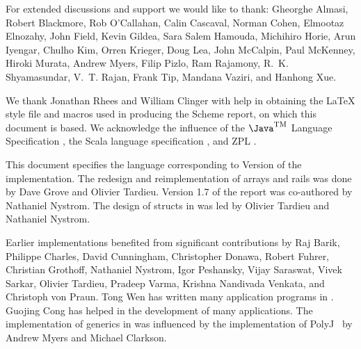 For extended discussions and support we would like to thank: 
Gheorghe Almasi,
Robert Blackmore,
Rob O'Callahan, 
Calin Cascaval, 
Norman Cohen, 
Elmootaz Elnozahy, 
John Field,
Kevin Gildea,
Sara Salem Hamouda,
Michihiro Horie,
Arun Iyengar,
Chulho Kim,
Orren Krieger, 
Doug Lea, 
John McCalpin, 
Paul McKenney, 
Hiroki Murata,
Andrew Myers,
Filip Pizlo, 
Ram Rajamony,
R.~K. Shyamasundar, 
V.~T. Rajan, 
Frank Tip,
Mandana Vaziri,
and
Hanhong Xue.


We thank Jonathan Rhees and William Clinger with help in obtaining the
\LaTeX{} style file and macros used in producing the Scheme report,
on which this document is based. We acknowledge the influence of
the $\mbox{\Java}^{\mbox{\textsc{tm}}}$ Language
Specification \cite{jls2}, the Scala language specification
\cite{scala-spec}, and ZPL \cite{zpl}.

This document specifies the language corresponding to Version
\integerversion{} of the implementation. The redesign and reimplementation of arrays and rails was  done by Dave Grove and Olivier Tardieu.
 Version 1.7 of the report was co-authored by Nathaniel Nystrom. The design of structs in \Xten{} was led by Olivier Tardieu and Nathaniel Nystrom.

Earlier implementations benefited from significant contributions by
Raj Barik, 
Philippe Charles, 
David Cunningham,
Christopher Donawa, 
Robert Fuhrer,
Christian Grothoff,
Nathaniel Nystrom,  
Igor Peshansky,  
Vijay Saraswat,
Vivek Sarkar, 
Olivier Tardieu,  
Pradeep Varma, 
Krishna Nandivada Venkata, and
Christoph von Praun.
Tong Wen has written many application programs
in \Xten{}. Guojing Cong has helped in the
development of many applications.
The implementation of generics in \Xten{} was influenced by the
implementation of PolyJ~\cite{polyj} by Andrew Myers and Michael Clarkson.
